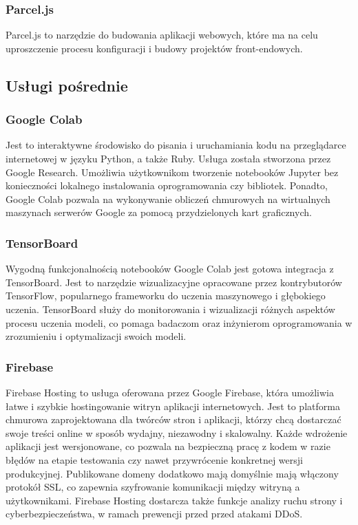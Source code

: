 \subsubsection{Parcel.js}
\label{subsubsec:parcel-js}

Parcel.js to narzędzie do budowania aplikacji webowych, które ma na celu uproszczenie procesu konfiguracji i budowy projektów front-endowych.

\subsection{Usługi pośrednie}
\label{subsec:service-vendors}

\subsubsection{Google Colab}
\label{subsubsec:google-colab}

Jest to interaktywne środowisko do pisania i uruchamiania kodu na przeglądarce internetowej w języku Python, a także Ruby. Usługa została stworzona przez Google Research. Umożliwia użytkownikom tworzenie notebooków Jupyter bez konieczności lokalnego instalowania oprogramowania czy bibliotek. Ponadto, Google Colab pozwala na wykonywanie obliczeń chmurowych na wirtualnych maszynach serwerów Google za pomocą przydzielonych kart graficznych.

\subsubsection{TensorBoard}
\label{subsubsec:tensorboard}

Wygodną funkcjonalnością notebooków Google Colab jest gotowa integracja z TensorBoard. Jest to narzędzie wizualizacyjne opracowane przez kontrybutorów TensorFlow, popularnego frameworku do uczenia maszynowego i głębokiego uczenia. TensorBoard służy do monitorowania i wizualizacji różnych aspektów procesu uczenia modeli, co pomaga badaczom oraz inżynierom oprogramowania w zrozumieniu i optymalizacji swoich modeli.

\subsubsection{Firebase}
\label{subsubsec:firebase}

Firebase Hosting to usługa oferowana przez Google Firebase, która umożliwia łatwe i szybkie hostingowanie witryn aplikacji internetowych. Jest to platforma chmurowa zaprojektowana dla twórców stron i aplikacji, którzy chcą dostarczać swoje treści online w sposób wydajny, niezawodny i skalowalny. Każde wdrożenie aplikacji jest wersjonowane, co pozwala na bezpieczną pracę z kodem w razie błędów na etapie testowania czy nawet przywrócenie konkretnej wersji produkcyjnej. Publikowane domeny dodatkowo mają domyślnie mają włączony protokół SSL, co zapewnia szyfrowanie komunikacji między witryną a użytkownikami. Firebase Hosting dostarcza także funkcje analizy ruchu strony i cyberbezpieczeństwa, w ramach prewencji przed przed atakami DDoS.

